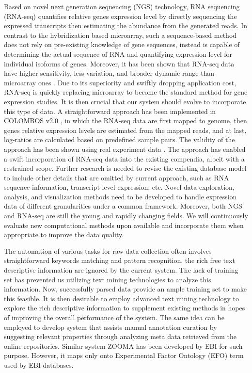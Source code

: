 Based on novel next generation sequencing (NGS) technology, RNA sequencing (RNA-seq) quantifies relative genes expression level by directly sequencing the expressed transcripts then estimating the abundance from the generated reads. In contrast to the hybridization based microarray, such a sequence-based method does not rely on pre-existing knowledge of gene sequences, instead is capable of determining the actual sequence of RNA and quantifying expression level for individual isoforms of genes. Moreover, it has been shown that RNA-seq data have higher sensitivity, less variation, and broader dynamic range than microarray ones \cite{Sirbu2012,Marioni2008}. Due to its superiority and swiftly dropping application cost, RNA-seq is quickly replacing microarray to become the standard method for gene expression studies. It is then crucial that our system should evolve to incorporate this type of data. A straightforward approach has been implemented in COLOMBOS v2.0 \cite{Meysman2014}, in which the RNA-seq data are first mapped to genome, then genes relative expression levels are estimated from the mapped reads, and at  last, log-ratios are calculated based on predefined sample pairs. The validity of the approach has been shown using real experiment data \cite{Meysman2014}. The approach has enabled a swift incorporation of RNA-seq data into the existing compendia, albeit with a restrained scope. Further research is needed to revise the existing database model to include other details that are omitted by current approach, such as RNA sequence information, transcript level expression, etc. Novel data exploration, analysis, and visualization methods need to be developed to handle expression data of different granularities under a common framework. Moreover, both NGS and RNA-seq are still the young and rapidly changing fields. We will continuously evaluate new computational methods upon available and incorporate them when appropriate to improve the data quality.

The automation of various tasks for raw data collection often involves straightforward keywords matching and pattern recognition, the rich free text descriptive information are ignored by the current system. The lack of training set has prevented us utilizing text mining technologies to analyze this information. Now, successfully parsed data provide an ample training set to make this feasible. It is then desirable to employ advanced text mining technology to explore the rich descriptive information to supplement existing methods in hopes of improving the overall performance of the system. The same idea can be employed to develop system that assists manual annotation curation by suggesting relevant properties through analyzing meta data retrieved from the online repositories. Similar system ZOOMA \cite{ZOOMA} has been developed by EBI for such purpose. However, it maps only onto Experimental Factor Ontology (EFO) term used by EBI databases.







